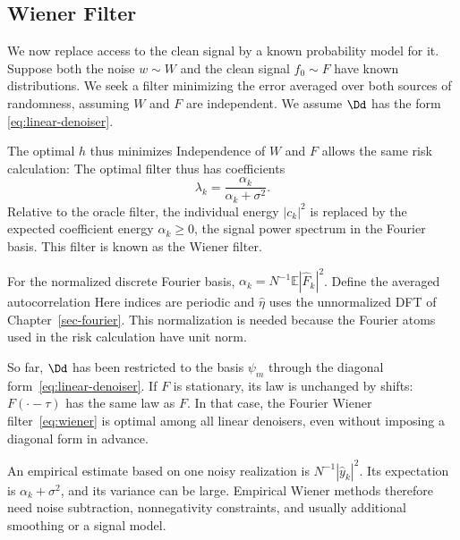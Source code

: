 \subsection{Wiener Filter}

We now replace access to the clean signal by a known probability model for it.
%
Suppose both the noise $w \sim W$ and the clean signal $f_0 \sim F$ have known distributions. We seek a filter minimizing the error averaged over both sources of randomness, assuming $W$ and $F$ are independent.
%
We assume $\Dd$ has the form \eqref{eq:linear-denoiser}. 


The optimal $h$ thus minimizes
Independence of $W$ and $F$ allows the same risk calculation:
The optimal filter thus has coefficients
\begin{equation}\label{eq:wiener}
	\lambda_k=\frac{\alpha_k}{\alpha_k+\sigma^2}.
\end{equation}
Relative to the oracle filter, the individual energy $|c_k|^2$ is replaced by the expected coefficient energy $\alpha_k\geq0$, the signal power spectrum in the Fourier basis.
%
This filter is known as the Wiener filter.

For the normalized discrete Fourier basis, $\alpha_k=N^{-1}\mathbb E|\hat F_k|^2$. Define the averaged autocorrelation
Here indices are periodic and $\hat\eta$ uses the unnormalized DFT of Chapter~\ref{sec-fourier}. This normalization is needed because the Fourier atoms used in the risk calculation have unit norm.

So far, $\Dd$ has been restricted to the basis $\psi_m$ through the diagonal form~\eqref{eq:linear-denoiser}. If $F$ is stationary, its law is unchanged by shifts: $F(\cdot-\tau)$ has the same law as $F$. In that case, the Fourier Wiener filter~\eqref{eq:wiener} is optimal among all linear denoisers, even without imposing a diagonal form in advance.

An empirical estimate based on one noisy realization is $N^{-1}|\hat y_k|^2$. Its expectation is $\alpha_k+\sigma^2$, and its variance can be large. Empirical Wiener methods therefore need noise subtraction, nonnegativity constraints, and usually additional smoothing or a signal model.

